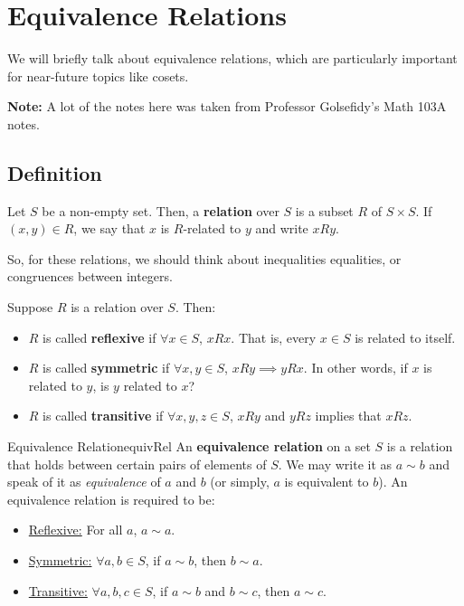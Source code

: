 \documentclass[letterpaper]{article}
\begin{document}
\newpage 
\section{Equivalence Relations}
We will briefly talk about equivalence relations, which are particularly important for near-future topics like cosets.

\bigskip 

\textbf{Note:} A lot of the notes here was taken from Professor Golsefidy's Math 103A notes. 

\subsection{Definition}
Let $S$ be a non-empty set. Then, a \textbf{relation} over $S$ is a subset $R$ of $S \times S$. If $(x, y) \in R$, we say that $x$ is $R$-related to $y$ and write $x R y$. 

\bigskip 

So, for these relations, we should think about inequalities equalities, or congruences between integers. 

\bigskip 

Suppose $R$ is a relation over $S$. Then:
\begin{itemize}
    \item $R$ is called \textbf{reflexive} if $\forall x \in S$, $x R x$. That is, every $x \in S$ is related to itself. 
    \item $R$ is called \textbf{symmetric} if $\forall x, y \in S$, $x R y \implies y R x$. In other words, if $x$ is related to $y$, is $y$ related to $x$? 
    \item $R$ is called \textbf{transitive} if $\forall x, y, z \in S$, $x R y$ and $y R z$ implies that $x R z$. 
\end{itemize}

\begin{definition}{Equivalence Relation}{equivRel}
    An \textbf{equivalence relation} on a set $S$ is a relation that holds between certain pairs of elements of $S$. We may write it as $a \sim b$ and speak of it as \emph{equivalence} of $a$ and $b$ (or simply, $a$ is equivalent to $b$). An equivalence relation is required to be: 
    \begin{itemize}
        \item \underline{Reflexive:} For all $a$, $a \sim a$. 
        \item \underline{Symmetric:} $\forall a, b \in S$, if $a \sim b$, then $b \sim a$. 
        \item \underline{Transitive:} $\forall a, b, c \in S$, if $a \sim b$ and $b \sim c$, then $a \sim c$. 
    \end{itemize}
\end{definition}
\end{document}
